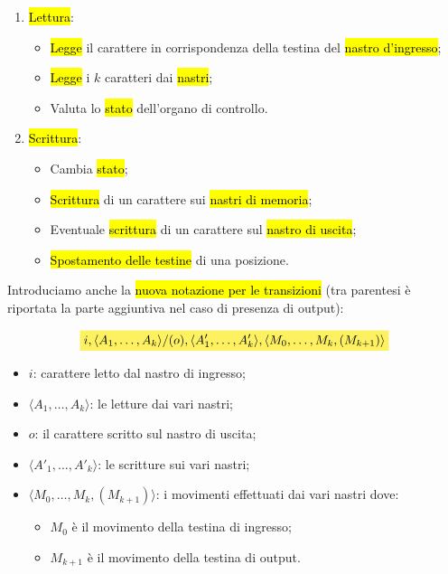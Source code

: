 \documentclass[a4paper,11pt,oneside]{article}
\theoremstyle{plain}
\theoremstyle{definition}
\theoremstyle{remark}
\newcommand{\mhl}[1]{\colorbox{hlcolor}{$\displaystyle #1$}}
\begin{document}
\begin{enumerate}
  \item \hl{Lettura}:
    \begin{itemize}
      \item \hl{Legge} il carattere in corrispondenza della testina del
        \hl{nastro d'ingresso};
      \item \hl{Legge} i $k$ caratteri dai \hl{nastri};
      \item Valuta lo \hl{stato} dell'organo di controllo.
    \end{itemize}
  \item \hl{Scrittura}:
    \begin{itemize}
      \item Cambia \hl{stato};
      \item \hl{Scrittura} di un carattere sui \hl{nastri di memoria};
      \item Eventuale \hl{scrittura} di un carattere sul \hl{nastro di uscita};
      \item \hl{Spostamento delle testine} di una posizione.
    \end{itemize}
\end{enumerate}

Introduciamo anche la \hl{nuova notazione per le transizioni} (tra parentesi è
riportata la parte aggiuntiva nel caso di presenza di output):

\begin{equation}
  \mhl{
  i, \langle A_1, \ldots, A_k \rangle/(o),
    \langle A'_1, \ldots, A'_k \rangle,
    \langle M_0, \ldots, M_k, (M_{k+1}) \rangle
  }
\end{equation}

\begin{itemize}
  \item $i$: carattere letto dal nastro di ingresso;
  \item $\langle A_1, \ldots, A_k \rangle$: le letture dai vari nastri;
  \item $o$: il carattere scritto sul nastro di uscita;
  \item $\langle A'_1, \ldots, A'_k \rangle$: le scritture sui vari nastri;
  \item $\langle M_0, \ldots, M_k, (M_{k+1}) \rangle$: i movimenti effettuati
    dai vari nastri dove:
    \begin{itemize}
      \item $M_0$ è il movimento della testina di ingresso;
      \item $M_{k+1}$ è il movimento della testina di output.
    \end{itemize}
\end{itemize}
\end{document}
